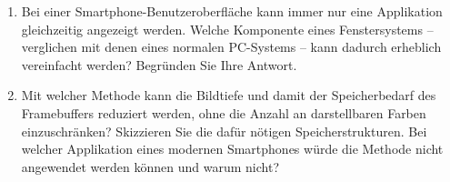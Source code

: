
\begin{enumerate}

\item Bei einer Smartphone-Benutzeroberfläche kann immer nur eine Applikation
gleichzeitig angezeigt werden. Welche Komponente eines Fenstersystems --
verglichen mit denen eines normalen PC-Systems -- kann dadurch erheblich vereinfacht
werden? Begründen Sie Ihre Antwort.

\item Mit welcher Methode kann die Bildtiefe und damit der Speicherbedarf des
Framebuffers reduziert werden, ohne die Anzahl an darstellbaren Farben
einzuschränken? Skizzieren Sie die dafür nötigen Speicherstrukturen. Bei welcher
Applikation eines modernen Smartphones würde die Methode nicht angewendet werden
können und warum nicht?

\end{enumerate}